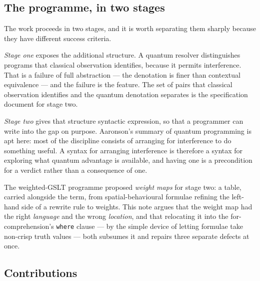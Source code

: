 \documentclass[11pt,a4paper]{article}
\theoremstyle{plain}
\theoremstyle{definition}
\theoremstyle{remark}
\begin{document}
\subsection{The programme, in two stages}

The work proceeds in two stages, and it is worth separating them sharply because
they have different success criteria.

\emph{Stage one} exposes the additional structure. A quantum resolver
distinguishes programs that classical observation identifies, because it permits
interference. That is a failure of full abstraction --- the denotation is finer
than contextual equivalence --- and the failure is the feature. The set of pairs
that classical observation identifies and the quantum denotation separates is
the specification document for stage two.

\emph{Stage two} gives that structure syntactic expression, so that a programmer
can write into the gap on purpose. Aaronson's summary of quantum programming is
apt here: most of the discipline consists of arranging for interference to do
something useful. A syntax for arranging interference is therefore a syntax for
exploring what quantum advantage is available, and having one is a precondition
for a verdict rather than a consequence of one.

The weighted-GSLT programme proposed \emph{weight maps} for stage two: a table,
carried alongside the term, from spatial-behavioural formulae refining the
left-hand side of a rewrite rule to weights. This note argues that the weight map
had the right \emph{language} and the wrong \emph{location}, and that relocating
it into the for-comprehension's \texttt{where} clause --- by the simple device of
letting formulae take non-crisp truth values --- both subsumes it and repairs
three separate defects at once.

\subsection{Contributions}
\end{document}
